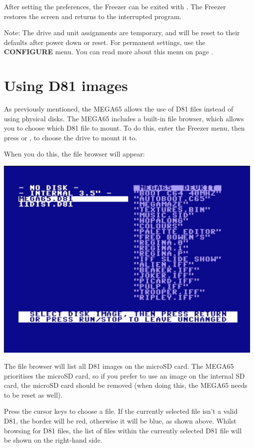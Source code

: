 After setting the preferences, the Freezer can be exited
with . The Freezer restores the screen and
returns to the interrupted program.

Note: The drive and unit assignments are temporary, and will be reset to their defaults
after power down or reset. For permanent settings, use the {\bf CONFIGURE}
menu. You can read more about this menu on page \pageref{configuring-chipset}.

\section{Using D81 images}
As previously mentioned, the MEGA65 allows the use of D81 files instead of using physical disks. The MEGA65 includes a
built-in file browser, which allows you to choose which D81 file to mount. To do this, enter the Freezer menu,
then press  or , to choose the drive to mount it to.

When you do this, the file browser will appear:

\begin{center}
\includegraphics[trim= 10mm 20mm 10mm 20mm,clip,width=0.7\linewidth]{images/d81-file-browser.png}
\end{center}

The file browser will list all D81 images on the microSD card. The MEGA65 prioritises the microSD card, so if you
prefer to use an image on the internal SD card, the microSD card should be removed (when doing this, the MEGA65 needs
to be reset as well).

Press the cursor keys to choose a file. If the currently selected file isn't a valid D81, the border will be red,
otherwise it will be blue, as shown above. Whilst browsing for D81 files, the list of files within the currently
selected D81 file will be shown on the right-hand side.

